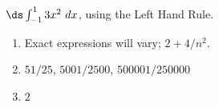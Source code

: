 {$\ds \int_{-1}^1 3x^2\ dx$, using the Left Hand Rule.
}
{\begin{enumerate}
\item		Exact expressions will vary; $2+4/n^2$.
\item		$51/25$, $5001/2500$, $500001/250000$
\item		$2$
\end{enumerate}
}

